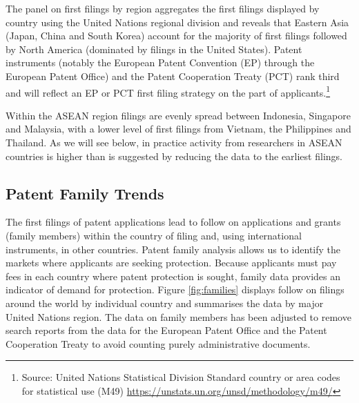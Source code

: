 \documentclass[openany]{book}
\let\rmarkdownfootnote\footnote%
\def\footnote{\protect\rmarkdownfootnote}
\theoremstyle{definition}
\theoremstyle{definition}
\theoremstyle{definition}
\theoremstyle{remark}
\begin{document}
The panel on first filings by region aggregates the first filings
displayed by country using the United Nations regional division and
reveals that Eastern Asia (Japan, China and South Korea) account for the
majority of first filings followed by North America (dominated by
filings in the United States). Patent instruments (notably the European
Patent Convention (EP) through the European Patent Office) and the
Patent Cooperation Treaty (PCT) rank third and will reflect an EP or PCT
first filing strategy on the part of applicants.\footnote{Source: United
  Nations Statistical Division Standard country or area codes for
  statistical use (M49)
  \url{https://unstats.un.org/unsd/methodology/m49/}}

Within the ASEAN region filings are evenly spread between Indonesia,
Singapore and Malaysia, with a lower level of first filings from
Vietnam, the Philippines and Thailand. As we will see below, in practice
activity from researchers in ASEAN countries is higher than is suggested
by reducing the data to the earliest filings.

\hypertarget{patent-family-trends}{%
\subsection{Patent Family Trends}\label{patent-family-trends}}

The first filings of patent applications lead to follow on applications
and grants (family members) within the country of filing and, using
international instruments, in other countries. Patent family analysis
allows us to identify the markets where applicants are seeking
protection. Because applicants must pay fees in each country where
patent protection is sought, family data provides an indicator of demand
for protection. Figure \ref{fig:families} displays follow on filings
around the world by individual country and summarises the data by major
United Nations region. The data on family members has been adjusted to
remove search reports from the data for the European Patent Office and
the Patent Cooperation Treaty to avoid counting purely administrative
documents.
\end{document}
